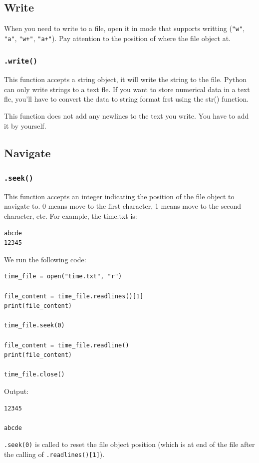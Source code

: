 \documentclass[12pt]{book}
\begin{document}
\subsection{Write}
\label{sec:org4591c06}
When you need to write to a file, open it in mode that supports writting (\texttt{"w"}, \texttt{"a"}, \texttt{"w+"}, \texttt{"a+"}). Pay attention to the position of where the file object at.
\subsubsection{\texttt{.write()}}
\label{sec:org60d905e}
This function accepts a string object, it will write the string to the file. Python can only write strings to a text fle. If you want to store numerical data in a text fle, you’ll have to convert the data to string format frst using the str() function.

This function does not add any newlines to the text you write. You have to add it by yourself.
\subsection{Navigate}
\label{sec:orge7c0344}
\subsubsection{\texttt{.seek()}}
\label{sec:orgd8e19aa}
This function accepts an integer indicating the position of the file object to navigate to. 0 means move to the first character, 1 means move to the second character, etc. For example, the time.txt is:
\begin{verbatim}
abcde
12345
\end{verbatim}
We run the following code:
\begin{verbatim}
time_file = open("time.txt", "r")

file_content = time_file.readlines()[1]
print(file_content)

time_file.seek(0)

file_content = time_file.readline()
print(file_content)

time_file.close()
\end{verbatim}
Output:
\begin{verbatim}
12345

abcde

\end{verbatim}
\texttt{.seek(0)} is called to reset the file object position (which is at end of the file after the calling of \texttt{.readlines()[1]}).
\end{document}
